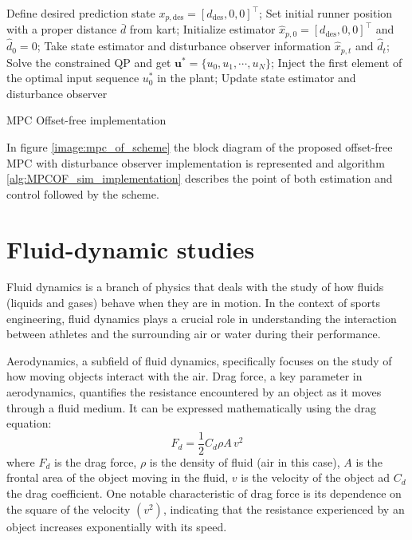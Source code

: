 \documentclass[a4paper,12pt,oneside]{book}
\begin{document}
\begin{algorithm}
\begin{algorithmic}[1]
	\State Define desired prediction state $x_{p,\text{des}} = [d_{\text{des}}, 0, 0]^\top$;
	\State Set initial runner position with a proper distance $\bar{d}$ from kart;
	\State Initialize estimator $\hat{x}_{p,0} = [d_{\text{des}}, 0, 0]^\top$ and $\hat{d}_0 = 0$;
		\State Take state estimator and disturbance observer information $\hat{x}_{p,t}$ and $\hat{d}_t$;
		\State Solve the constrained QP and get $\boldsymbol{u}^* = \{u_0, u_1, \cdots, u_N\}$; 
		\State Inject the first element of the optimal input sequence $u_0^*$ in the plant;
		\State Update state estimator and disturbance observer 
	\EndFor
\caption{MPC Offset-free implementation}
\label{alg:MPCOF_sim_implementation}
\end{algorithmic}
\end{algorithm}

\bigskip
In figure \ref{image:mpc_of_scheme} the block diagram of the proposed offset-free MPC with disturbance observer implementation is represented and algorithm \ref{alg:MPCOF_sim_implementation} describes the point of both estimation and control followed by the scheme.

\newpage
\section{Fluid-dynamic studies}

Fluid dynamics is a branch of physics that deals with the study of how fluids (liquids and gases) behave when they are in motion.
In the context of sports engineering, fluid dynamics plays a crucial role in understanding the interaction between athletes and the surrounding air or water during their performance.

Aerodynamics, a subfield of fluid dynamics, specifically focuses on the study of how moving objects interact with the air. 
Drag force, a key parameter in aerodynamics, quantifies the resistance encountered by an object as it moves through a fluid medium. 
It can be expressed mathematically using the drag equation:
\begin{equation}
	F_d = \frac{1}{2} C_d \rho A \, v^2
\end{equation}
where $F_d$ is the drag force, $\rho$ is the density of fluid (air in this case), $A$ is the frontal area of the object moving in the fluid, 
$v$ is the velocity of the object ad $C_d$ the drag coefficient.
One notable characteristic of drag force is its dependence on the square of the velocity $(v^2)$, indicating that the resistance experienced by an object increases exponentially with its speed. 
\end{document}
